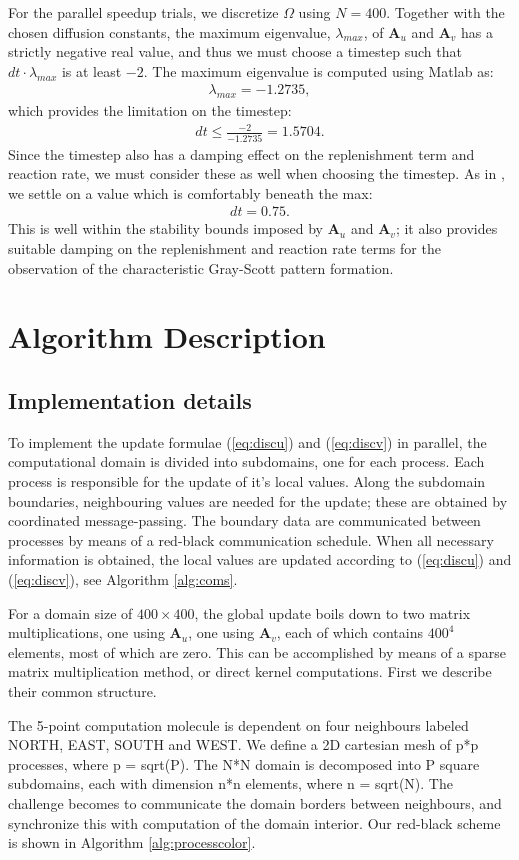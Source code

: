 \documentclass[a4paper,11pt]{article}
\newcommand{\ba}[1]{\begin{align*}    #1    \end{align*}}
\renewcommand{\vec}[1]{\mathbf{#1}}
\begin{document}
For the parallel speedup trials, we discretize $\Omega$ using $N = 400$.  Together with the chosen diffusion constants, the  maximum eigenvalue, $\lambda_{max}$, of $\vec{A}_u$ and $\vec{A}_v$ has a strictly negative real value, and thus we must choose a timestep such that $dt \cdot \lambda_{max}$ is at least $-2$.  The maximum eigenvalue is computed using Matlab as:
\ba{
\lambda_{max} = -1.2735,
}
which provides the limitation on the timestep:
\ba{
dt \le \frac{-2}{-1.2735} = 1.5704.
}
Since the timestep also has a damping effect on the replenishment term and reaction rate, we must consider these as well when choosing the timestep.  As in \cite{Wang}, we settle on a value which is comfortably beneath the max:
\ba{
dt = 0.75.
}
This is well within the stability bounds imposed by $\vec{A}_u$ and $\vec{A}_v$; it also provides suitable damping on the replenishment and reaction rate terms for the observation of the characteristic Gray-Scott pattern formation.

\section*{Algorithm Description}
\subsection*{Implementation details}
To implement the update formulae (\ref{eq:discu}) and (\ref{eq:discv}) in parallel, the computational domain is divided into subdomains, one for each process.  Each process is responsible for the update of it's local values.  Along the subdomain boundaries, neighbouring values are needed for the update; these are obtained by coordinated message-passing.  The boundary data are communicated between processes by means of a red-black communication schedule.  When all necessary information is obtained, the local values are updated according to (\ref{eq:discu}) and (\ref{eq:discv}), see Algorithm \ref{alg:coms}.

For a domain size of $400 \times 400$, the global update boils down to two matrix multiplications, one using $\vec{A}_u$, one using $\vec{A}_v$, each of which contains $400^4$ elements, most of which are zero.  This can be accomplished by means of a sparse matrix multiplication method, or direct kernel computations. First we describe their common structure.

The 5-point computation molecule is dependent on four neighbours labeled NORTH, EAST, SOUTH and WEST. We define a 2D cartesian mesh of p*p processes, where p = sqrt(P). The N*N domain is decomposed into P square subdomains, each with dimension n*n elements, where n = sqrt(N). The challenge becomes to communicate the domain borders between neighbours, and synchronize this with computation of the domain interior. Our red-black scheme is shown in Algorithm \ref{alg:processcolor}.
\end{document}
